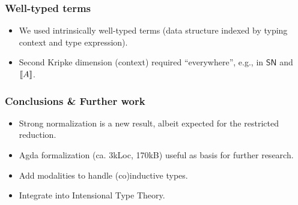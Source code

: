 \documentclass[t]{beamer}
\renewcommand{\SN}{\mathsf{SN}}
\newcommand{\cAnn}{\color{red!80!black}}%
\renewcommand{\emph}[1]{{\cAnn#1}}
\begin{document}
\begin{frame}%
  \frametitle{Well-typed terms}
  
  \begin{itemize}
  \item We used intrinsically well-typed terms (data structure indexed
    by typing context and type expression).
  \item Second Kripke dimension (context) required ``everywhere'', e.g.,
    in $\SN$ and $\llbracket A \rrbracket$.
  \end{itemize}
\end{frame}




\begin{frame}%
  \frametitle{Conclusions \& Further work}
  \begin{itemize}
  \item \emph{Strong} normalization is a new result, albeit expected for the restricted reduction.
  \item Agda formalization (ca. 3kLoc, 170kB) useful as basis for further research.
  \item Add modalities to handle (co)inductive types.
  \item Integrate into Intensional Type Theory.
  \end{itemize}
\end{frame}





% 
\end{document}

